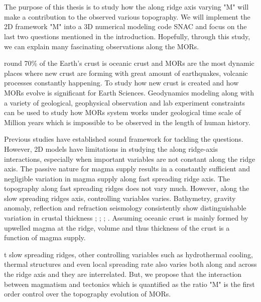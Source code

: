 \documentclass[12pt]{article}
\begin{document}
\break
\section{}
\label{ch:purpose}

The purpose of this thesis is to study how the along ridge axis varying "M" will make a contribution to the observed various topography. We will implement the 2D framework "M" into a 3D numerical modeling code SNAC \citep{Choi2008} and focus on the last two questions mentioned in the introduction. Hopefully, through this study, we can explain many fascinating observations along the MORs.

round 70\% of the Earth's crust is oceanic crust and MORs are the most dynamic places where new crust are forming with great amount of earthquakes, volcanic processes constantly happening. To study how new crust is created and how MORs evolve is significant for Earth Sciences. Geodynamics modeling along with a variety of geological, geophysical observation and lab experiment constraints can be used to study how MORs system works under geological time scale of Million years which is impossible to be observed in the length of human history.

Previous studies have established sound framework for tackling the questions. However, 2D models have limitations in studying the along ridge-axis interactions, especially when important variables are not constant along the ridge axis. The passive nature for magma supply results in a constantly sufficient and negligible variation in magma supply along fast spreading ridge axis. The topography along fast spreading ridges does not vary much. However, along the slow spreading ridges axis, controlling variables varies. Bathymetry, gravity anomaly, reflection and refraction seismology consistently show distinguishable variation in crustal thickness \citep{Ryan2009}; \citep{Chen1999}; \citep{Lin1990}; \citep{Tolstoy1993}. Assuming oceanic crust is mainly formed by upwelled magma at the ridge, volume and thus thickness of the crust is a function of magma supply.

t slow spreading ridges, other controlling variables such as hydrothermal cooling, thermal structures and even local spreading rate \citep{Baines2008} also varies both along and across the ridge axis and they are interrelated. But, we propose that the interaction between magmatism and tectonics which is quantified as the ratio "M" is the first order control over the topography evolution of MORs. 
\end{document}
